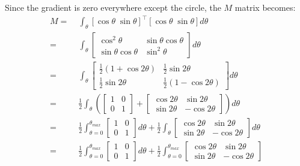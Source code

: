 \documentclass[11pt,english]{article}
\begin{document}
\begin{enumerate}
Since the gradient is zero everywhere except the circle, the $M$ matrix becomes:
\begin{align*}
    M =&\; \int_{\theta}[\cos\theta\;\sin\theta]^\top[\cos\theta\;\sin\theta] d\theta \\
    =&\; \int_{\theta}
        \begin{bmatrix}
            \cos^2 \theta & \sin\theta \cos\theta \\
            \sin\theta \cos\theta & \sin^2 \theta
        \end{bmatrix} d\theta \\
    =&\; \int_{\theta}
        \begin{bmatrix}
            \frac{1}{2} (1 + \cos 2\theta) & \frac{1}{2}\sin2\theta \\
            \frac{1}{2}\sin2\theta & \frac{1}{2} (1 - \cos 2\theta)
        \end{bmatrix} d\theta \\
    =&\; \frac{1}{2} \int_{\theta} \left(
        \begin{bmatrix}
            1 & 0 \\
            0 & 1
        \end{bmatrix} + 
        \begin{bmatrix}
            \cos 2\theta & \sin 2\theta \\
            \sin 2\theta & -\cos 2\theta
        \end{bmatrix} \right) d\theta \\
    =&\; \frac{1}{2} \int_{\theta=0}^{\theta_{max}}
        \begin{bmatrix}
            1 & 0 \\
            0 & 1
        \end{bmatrix} d\theta + \frac{1}{2} \int_{\theta}
        \begin{bmatrix}
            \cos 2\theta & \sin 2\theta \\
            \sin 2\theta & -\cos 2\theta
        \end{bmatrix} d\theta \\ 
    =&\; \frac{1}{2} \int_{\theta=0}^{\theta_{max}} 
        \begin{bmatrix}
            1 & 0 \\
            0 & 1
        \end{bmatrix} d\theta + \frac{1}{2} \int_{\theta=0}^{\theta_{max}}
        \begin{bmatrix}
            \cos 2\theta & \sin 2\theta \\
            \sin 2\theta & -\cos 2\theta

\end{bmatrix}
\end{align*}
\end{enumerate}
\end{document}
